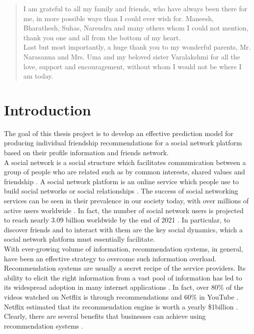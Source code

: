 \documentclass{kththesis}
\begin{document}
\begin{abstract}
I am grateful to all my family and friends, who have always been there for me, in more possible ways than I could ever wish for. Maneesh, Bharathesh, Suhas, Narendra and many others whom I could not mention, thank you one and all from the bottom of my heart. \\

Last but most importantly, a huge thank you to my wonderful parents, Mr. Narasanna and Mrs. Uma and my beloved sister Varalakshmi for all the love, support and encouragement, without whom I would not be where I am today. \\

\end{abstract}


\tableofcontents

\mainmatter

\chapter{Introduction}
The goal of this thesis project is to develop an effective prediction model for producing individual friendship recommendations for a social network platform based on their profile information and friends network. \\

A social network is a social structure which facilitates communication between a group of people who are related such as by common interests, shared values and friendship \cite{socnet}. A social network platform is an online service which people use to build social networks or social relationships \cite{snpwiki}. The success of social networking services can be seen in their prevalence in our society today, with over millions of active users worldwide \cite{snpwiki}. In fact, the number of social network users is projected to reach nearly 3.09 billion worldwide by the end of 2021 \cite{stats}. In particular, to discover friends and to interact with them are the key social dynamics, which a social network platform must essentially facilitate. \\

With ever-growing volume of information, recommendation systems, in general, have been an effective strategy to overcome such information overload. Recommendation systems are usually a secret recipe of the service providers. Its ability to elicit the right information from a vast pool of information has led to its widespread adoption in many internet applications \cite{shuai}. In fact, over 80\% of the videos watched on Netflix is through recommendations \cite{netflix} and 60\% in YouTube \cite{youtube}. Netflix estimated that its recommendation engine is worth a yearly \$1billion \cite{netflix2}. Clearly, there are several benefits that businesses can achieve using recommendation systems \cite{buzz}. \\
\end{document}
